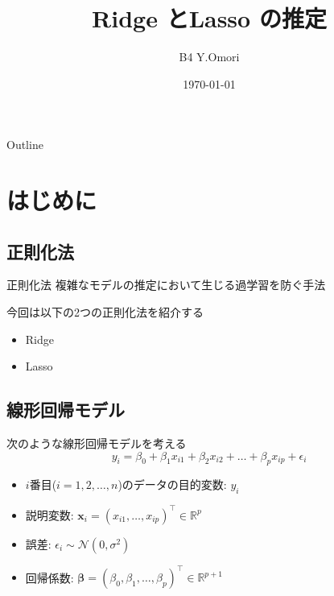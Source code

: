 \documentclass[dvipdfmx, 10pt]{beamer}
\title[]{Ridge とLasso の推定}
\author[Y.Omori]{B4 Y.Omori}
\date[\today]{\today}
\institute[NIT]{Nagoya Institute of Technology \\ Takeuchi \& Karasuyama Lab}
\begin{document}
\begin{frame}{}
\maketitle%
\thispagestyle{empty}%
\addtocounter{framenumber}{-1}%
\end{frame}
\begin{frame}{Outline}
\tableofcontents[hideallsubsections]
\end{frame}

\section{はじめに}
\subsection{正則化法}
\begin{frame}{\insertsubsection}
    \begin{block}{正則化法}
        複雑なモデルの推定において生じる過学習を防ぐ手法
    \end{block}
    \vspace{10pt}
        今回は以下の2つの正則化法を紹介する
    \begin{itemize}
        \item Ridge
      \item Lasso
    \end{itemize}
\end{frame}
\subsection{線形回帰モデル}
\begin{frame}{\insertsubsection}
    次のような線形回帰モデルを考える
    \begin{equation}
    	y_i=\beta_0 + \beta_1 x_{i1} + \beta_2  x_{i2} + \dots + \beta_p x_{ip} + \epsilon_i
    	\label{eq:linear_model_origin}
    \end{equation}    
    \begin{itemize}
        \item $i$番目($i = 1, 2, \dots, n$)のデータの目的変数: $y_i$\\
        \item 説明変数: $\bm{x}_i=(x_{i1}, \dots, x_{ip})^{\top} \in \mathbb{R}^p$\\
        \item 誤差: $\epsilon_i \sim \mathcal{N}(0, \sigma^2)$\\
        \item 回帰係数: $\bm{\beta}=(\beta_0, \beta_1, \dots , \beta_p)^{\top} \in \mathbb{R}^{p+1}$
    \end{itemize}
\end{frame}
\end{document}

